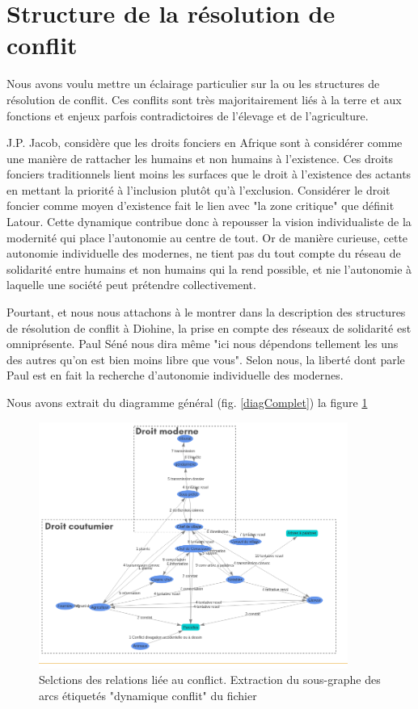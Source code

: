 \section{Structure de la résolution de conflit}

Nous avons voulu mettre un éclairage particulier sur la ou les structures de résolution de conflit. Ces conflits sont très majoritairement liés à la terre et aux fonctions et enjeux parfois contradictoires de l'élevage et de l'agriculture.

J.P. Jacob\cite{jacob_terres_2007}, considère que les droits fonciers en Afrique sont à considérer comme une manière de rattacher les humains et non humains à l'existence. Ces droits fonciers traditionnels lient moins les surfaces que le droit à l'existence des actants en mettant la priorité à l'inclusion plutôt qu'à l'exclusion. Considérer le droit foncier comme moyen d'existence fait le lien avec "la zone critique" que définit Latour\cite{latour_face_2015}. Cette dynamique contribue donc à repousser la vision individualiste de la modernité qui place l'autonomie au centre de tout. Or de manière curieuse, cette autonomie individuelle des modernes, ne tient pas du tout compte du réseau de solidarité entre humains et non humains qui la rend possible, et nie l'autonomie à laquelle une société peut prétendre collectivement.

Pourtant, et nous nous  attachons à le montrer dans la description des structures de résolution de conflit à Diohine, la prise en compte des réseaux de solidarité est omniprésente. Paul Séné nous dira même "ici nous dépendons tellement les uns des autres qu'on est bien moins libre que vous". Selon nous, la liberté dont parle Paul est en fait la recherche d'autonomie individuelle des modernes.


Nous avons extrait du diagramme général (fig. \ref{diagComplet}) la figure \ref{fig:conflict}

\begin{figure}
  \begin{center}
    \includegraphics[width=0.9\textwidth]{img/zoneDroitConflits.png}
  \end{center}
  \caption{Selctions des relations liée au conflict. Extraction du sous-graphe des arcs étiquetés "dynamique conflit" du fichier}
  \label{fig:conflict}
\end{figure}

